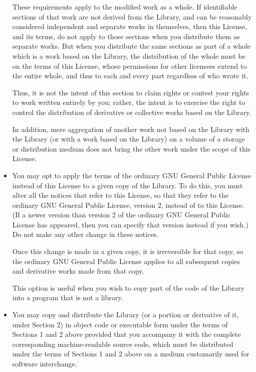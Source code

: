 \begin{multicols}{3}
\begin{itemize}
   These requirements apply to the modified work as a whole. If
   identifiable sections of that work are not derived from the Library, and
   can be reasonably considered independent and separate works in
   themselves, then this License, and its terms, do not apply to those
   sections when you distribute them as separate works. But when you
   distribute the same sections as part of a whole which is a work based on
   the Library, the distribution of the whole must be on the terms of this
   License, whose permissions for other licensees extend to the entire
   whole, and thus to each and every part regardless of who wrote it.

   Thus, it is not the intent of this section to claim rights or contest
   your rights to work written entirely by you; rather, the intent is to
   exercise the right to control the distribution of derivative or
   collective works based on the Library.

   In addition, mere aggregation of another work not based on the Library
   with the Library (or with a work based on the Library) on a volume of a
   storage or distribution medium does not bring the other work under the
   scope of this License.
   
 \item[3.] You may opt to apply the terms of the ordinary GNU General
   Public License instead of this License to a given copy of the
   Library. To do this, you must alter all the notices that refer to
   this License, so that they refer to the ordinary GNU General Public
   License, version 2, instead of to this License. (If a newer version
   than version 2 of the ordinary GNU General Public License has
   appeared, then you can specify that version instead if you wish.)
   Do not make any other change in these notices.

   Once this change is made in a given copy, it is irreversible for that
   copy, so the ordinary GNU General Public License applies to all
   subsequent copies and derivative works made from that copy.

   This option is useful when you wish to copy part of the code of the
   Library into a program that is not a library.
   
 \item[4.] You may copy and distribute the Library (or a portion or
   derivative of it, under Section 2) in object code or executable
   form under the terms of Sections 1 and 2 above provided that you
   accompany it with the complete corresponding machine-readable
   source code, which must be distributed under the terms of Sections
   1 and 2 above on a medium customarily used for software
   interchange.


\end{itemize}
\end{multicols}
